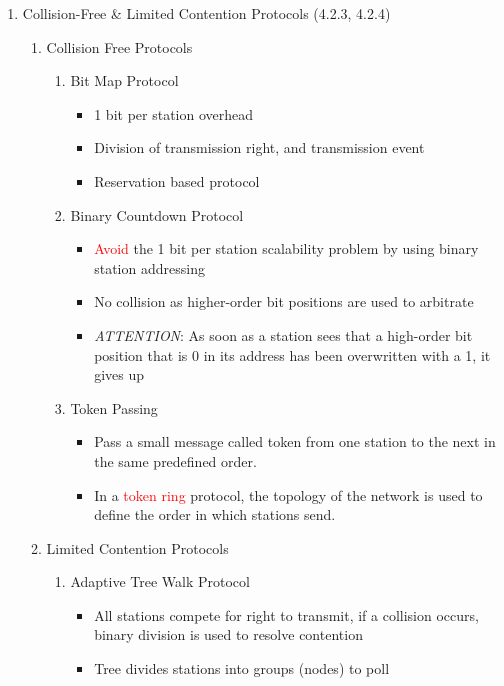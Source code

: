 \documentclass[a4paper,10pt]{article}
\newcommand{\red}[1]{\textcolor{red}{#1}}
\begin{document}
\begin{enumerate}
  \newpage\item Collision-Free \& Limited Contention Protocols (4.2.3, 4.2.4)
    \begin{enumerate}
      \item Collision Free Protocols
        \begin{enumerate}
          \item Bit Map Protocol
            \begin{itemize}
              \item 1 bit per station overhead
              \item Division of transmission right, and transmission event
              \item Reservation based protocol
            \end{itemize}
          \item Binary Countdown Protocol
            \begin{itemize}
              \item\red{Avoid} the 1 bit per station scalability problem by using binary station addressing
              \item No collision as higher-order bit positions are used to arbitrate
              \item \textit{ATTENTION}: As soon as a station sees that a high-order bit position that is 0 in its address has been overwritten with a 1, it gives up
            \end{itemize}
          \item Token Passing
            \begin{itemize}
              \item Pass a small message called token from one station to the next in the same predefined order.
              \item In a \red{token ring} protocol, the topology of the network is used to define the order in which stations send.
            \end{itemize}
        \end{enumerate}
      \item Limited Contention Protocols
        \begin{enumerate}
          \item Adaptive Tree Walk Protocol
            \begin{itemize}
              \item All stations compete for right to transmit, if a collision occurs, binary division is used to resolve contention
              \item Tree divides stations into groups (nodes) to poll

\end{itemize}
\end{enumerate}
\end{enumerate}
\end{enumerate}
\end{document}
